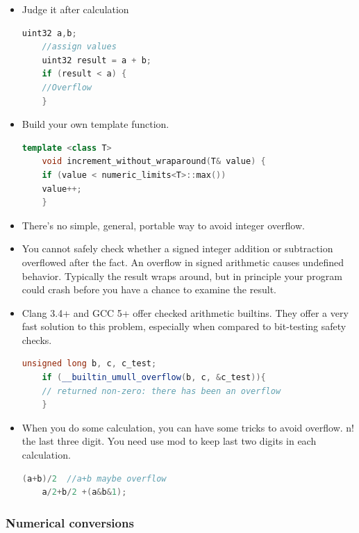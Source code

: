 \documentclass[a4paper,12pt,twoside]{book}
\begin{document}
\begin{itemize}
	\item Judge it after calculation
	\begin{lstlisting}[frame=single, language=c++]
	uint32 a,b;
	//assign values
	uint32 result = a + b;
	if (result < a) {
	//Overflow
	}
	\end{lstlisting}
	
	\item Build your own template function.
	\begin{lstlisting}[frame=single, language=c++]
	template <class T>
	void increment_without_wraparound(T& value) {
	if (value < numeric_limits<T>::max())
	value++;
	}
	\end{lstlisting}
	
	\item There's no simple, general, portable way to avoid integer overflow.
	\item You cannot safely check whether a signed integer addition or subtraction overflowed after the fact. An overflow in signed arithmetic causes undefined behavior. Typically the result wraps around, but in principle your program could crash before you have a chance to examine the result.
	
	\item Clang 3.4+ and GCC 5+ offer checked arithmetic builtins. They offer a very fast solution to this problem, especially when compared to bit-testing safety checks.
	\begin{lstlisting}[frame=single, language=c++]
	unsigned long b, c, c_test;
	if (__builtin_umull_overflow(b, c, &c_test)){
	// returned non-zero: there has been an overflow
	}
	\end{lstlisting}
	
	\item When you do some calculation, you can have some tricks to avoid overflow. n! the last three digit. You need use mod to keep last two digits in each calculation.
	\begin{lstlisting}[frame=single, language=c++]
	(a+b)/2  //a+b maybe overflow
	a/2+b/2 +(a&b&1);
	\end{lstlisting}
	
\end{itemize}


\subsubsection{Numerical conversions}
\end{document}
